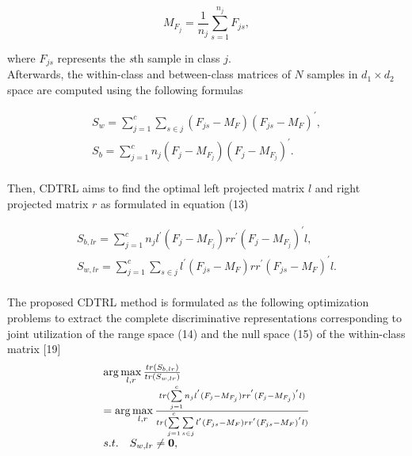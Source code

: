 \documentclass[journal]{IEEEtran}
\begin{document}
\begin{small}
\begin{equation}
{M_{{F_j}}} = \frac{1}{{{n_j}}}\sum\limits_{s = 1}^{{n_j}} {{F_{js}}},
\end{equation}
\end{small}
where $F_{js}$ represents the \emph{s}th sample in class $j$.\\\indent Afterwards, the within-class and between-class matrices of $N$ samples in ${d_1} \times {d_2}$ space are computed using the following formulas
\begin{small}
\begin{equation}
\begin{array}{l}
 {S_w} = \sum\limits_{j = 1}^c {\sum\limits_{s \in j} {({F_{js}} - {M_F}){{({F_{js}} - {M_F})}^{'}}} },  \\
 {S_b} = \sum\limits_{j = 1}^c {{n_j}({F_j} - {M_{{F_j}}}){{({F_j} - {M_{{F_j}}})}^{'}}}.  \\
 \end{array}
\end{equation}
\end{small}
Then, CDTRL aims to find the optimal left projected matrix $l$ and right projected matrix $r$ as formulated in equation (13)
\begin{small}
\begin{equation}
\begin{array}{l}
 {S_{b,lr}} = \sum\limits_{j = 1}^c {{n_j}{l^{'}}({F_j} - {M_{{F_j}}})r{r^{'}}{{({F_j} - {M_{{F_j}}})}^{'}}l},  \\
 {S_{w,lr}} = \sum\limits_{j = 1}^c {\sum\limits_{s \in j} {{l^{'}}({F_{js}} - {M_F})r{r^{'}}{{({F_{js}} - {M_F})}^{'}}l} }.  \\
 \end{array}
\end{equation}
\end{small}
The proposed CDTRL method is formulated as the following optimization problems to extract the complete discriminative representations corresponding to joint utilization of the range space (14) and the null space (15) of the within-class matrix [19]
\begin{equation}
\begin{array}{l}
 \arg \mathop {\max }\limits_{l,r} \frac{{tr({S_{b,lr}})}}{{tr({S_{w,lr}})}} \\
  = \arg \mathop {\max }\limits_{l,r} \frac{{tr(\sum\limits_{j = 1}^c {{n_j}{l^{'}}({F_j} - {M_{{F_j}}})r{r^{'}}{{({F_j} - {M_{{F_j}}})}^{'}}l} )}}{{tr(\sum\limits_{j = 1}^c {\sum\limits_{s \in j} {{l^{'}}({F_{js}} - {M_F})r{r^{'}}{{({F_{js}} - {M_F})}^{'}}l} } )}} \\
 s.t.\quad{\rm{ }}{S_{w,lr}} \ne {\bf{0}}, \\
 \end{array}
\end{equation}
\end{document}
